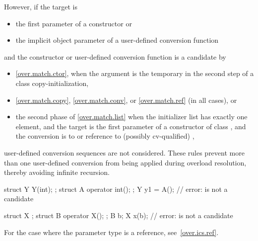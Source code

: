 \pnum
However, if the target is
\begin{itemize}
\item the first parameter of a constructor or
\item the implicit object parameter of a user-defined conversion function
\end{itemize}
and the constructor or user-defined conversion function is a candidate by
\begin{itemize}
\item \ref{over.match.ctor}, when the argument is the temporary in the second
step of a class copy-initialization,
\item \ref{over.match.copy}, \ref{over.match.conv}, or \ref{over.match.ref}
(in all cases), or
\item the second phase of \ref{over.match.list} when the initializer list
has exactly one element, and the target is the first parameter of a constructor
of class , and the conversion is to  or reference to
(possibly cv-qualified) ,
\end{itemize}
user-defined conversion sequences are not considered.
\enternote
These rules prevent more than one user-defined conversion from being
applied during overload resolution, thereby avoiding infinite recursion.
\exitnote
\enterexample
\begin{codeblock}
  struct Y { Y(int); };
  struct A { operator int(); };
  Y y1 = A();  // error:  is not a candidate

  struct X { };
  struct B { operator X(); };
  B b;
  X x({b});    // error:  is not a candidate
\end{codeblock}
\exitexample

\pnum
For the case where the parameter type is a reference, see~\ref{over.ics.ref}.

